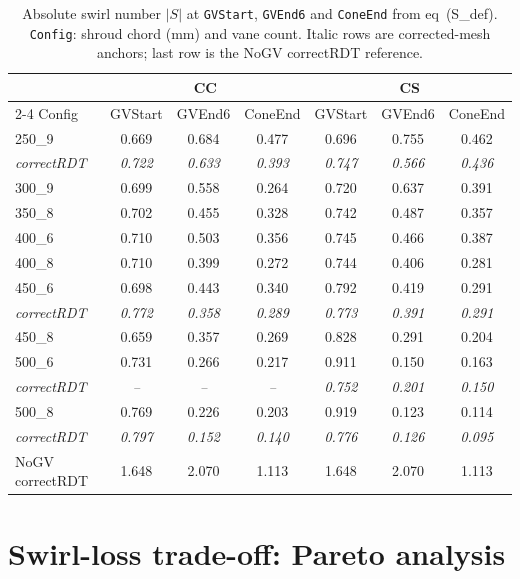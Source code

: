 \begin{table}[h!]
\centering\small
\caption[Absolute swirl number, CC and CS]{Absolute swirl number $|S|$ at \texttt{GVStart}, \texttt{GVEnd6} and \texttt{ConeEnd} from eq~(S\_def). \texttt{Config}: shroud chord (mm) and vane count. Italic rows are corrected-mesh anchors; last row is the NoGV correctRDT reference.}
\label{tab:swirl-wide}
\setlength{\tabcolsep}{5pt}
\begin{tabular}{l ccc ccc}
\hline
 & \multicolumn{3}{c}{CC} & \multicolumn{3}{c}{CS} \\
\cline{2-4}\cline{5-7}
Config & GVStart & GVEnd6 & ConeEnd & GVStart & GVEnd6 & ConeEnd \\
\hline
250\_9 & 0.669 & 0.684 & 0.477 & 0.696 & 0.755 & 0.462 \\
\quad\textit{correctRDT} & \textit{0.722} & \textit{0.633} & \textit{0.393} & \textit{0.747} & \textit{0.566} & \textit{0.436} \\
300\_9 & 0.699 & 0.558 & 0.264 & 0.720 & 0.637 & 0.391 \\
350\_8 & 0.702 & 0.455 & 0.328 & 0.742 & 0.487 & 0.357 \\
400\_6 & 0.710 & 0.503 & 0.356 & 0.745 & 0.466 & 0.387 \\
400\_8 & 0.710 & 0.399 & 0.272 & 0.744 & 0.406 & 0.281 \\
450\_6 & 0.698 & 0.443 & 0.340 & 0.792 & 0.419 & 0.291 \\
\quad\textit{correctRDT} & \textit{0.772} & \textit{0.358} & \textit{0.289} & \textit{0.773} & \textit{0.391} & \textit{0.291} \\
450\_8 & 0.659 & 0.357 & 0.269 & 0.828 & 0.291 & 0.204 \\
500\_6 & 0.731 & 0.266 & 0.217 & 0.911 & 0.150 & 0.163 \\
\quad\textit{correctRDT} & \textit{--} & \textit{--} & \textit{--} & \textit{0.752} & \textit{0.201} & \textit{0.150} \\
500\_8 & 0.769 & 0.226 & 0.203 & 0.919 & 0.123 & 0.114 \\
\quad\textit{correctRDT} & \textit{0.797} & \textit{0.152} & \textit{0.140} & \textit{0.776} & \textit{0.126} & \textit{0.095} \\
\hline
NoGV correctRDT & 1.648 & 2.070 & 1.113 & 1.648 & 2.070 & 1.113 \\
\hline
\end{tabular}
\end{table}

\section{Swirl-loss trade-off: Pareto analysis}
\label{sec:pareto-front}

